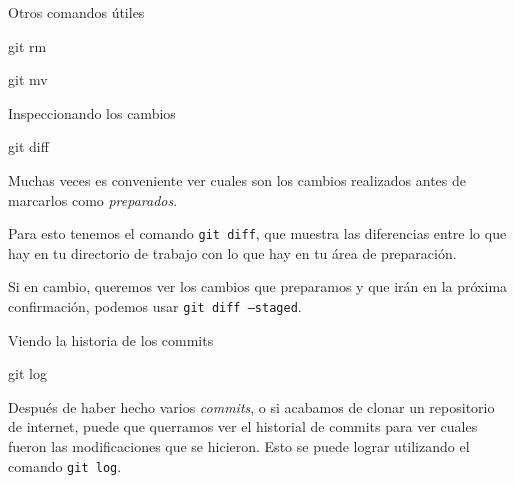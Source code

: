 \begin{frame}[t]{Otros comandos útiles}
    \begin{comando}
        git rm
    \end{comando}


    \vspace{2em}

    \begin{comando}
        git mv
    \end{comando}

\end{frame}

\begin{frame}[t]{Inspeccionando los cambios}
    \begin{comando}
        git diff
    \end{comando}

    \begin{block}{}
        Muchas veces es conveniente ver cuales son los cambios realizados antes de marcarlos como \textit{preparados}.

        Para esto tenemos el comando \texttt{git diff}, que muestra las diferencias entre lo que hay en
        tu directorio de trabajo con lo que hay en tu área de preparación.

        \vspace{1em}

        Si en cambio, queremos ver los cambios que preparamos y que irán en la próxima confirmación, podemos usar \texttt{git diff --staged}.
    \end{block}
\end{frame}

\begin{frame}[t]{Viendo la historia de los commits}
    \begin{comando}
        git log
    \end{comando}

    \pause
    \begin{block}{}
        Después de haber hecho varios \textit{commits}, o si acabamos de clonar un repositorio
        de internet, puede que querramos ver el historial de commits para ver cuales
        fueron las modificaciones que se hicieron. Esto se puede lograr utilizando el
        comando \texttt{git log}.
    \end{block}
\end{frame}

